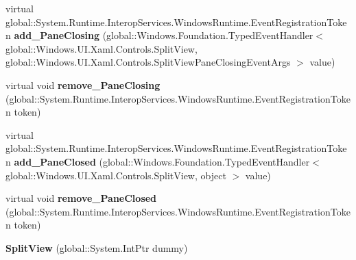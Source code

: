 \begin{DoxyCompactItemize}
virtual global\+::\+System.\+Runtime.\+Interop\+Services.\+Windows\+Runtime.\+Event\+Registration\+Token {\bfseries add\+\_\+\+Pane\+Closing} (global\+::\+Windows.\+Foundation.\+Typed\+Event\+Handler$<$ global\+::\+Windows.\+U\+I.\+Xaml.\+Controls.\+Split\+View, global\+::\+Windows.\+U\+I.\+Xaml.\+Controls.\+Split\+View\+Pane\+Closing\+Event\+Args $>$ value)
\item 
\mbox{\label{class_windows_1_1_u_i_1_1_xaml_1_1_controls_1_1_split_view_a7e6d1bbf867167e713891bded6a87a82}} 
virtual void {\bfseries remove\+\_\+\+Pane\+Closing} (global\+::\+System.\+Runtime.\+Interop\+Services.\+Windows\+Runtime.\+Event\+Registration\+Token token)
\item 
\mbox{\label{class_windows_1_1_u_i_1_1_xaml_1_1_controls_1_1_split_view_a97df60d3e67c146b713f4eb1565c5602}} 
virtual global\+::\+System.\+Runtime.\+Interop\+Services.\+Windows\+Runtime.\+Event\+Registration\+Token {\bfseries add\+\_\+\+Pane\+Closed} (global\+::\+Windows.\+Foundation.\+Typed\+Event\+Handler$<$ global\+::\+Windows.\+U\+I.\+Xaml.\+Controls.\+Split\+View, object $>$ value)
\item 
\mbox{\label{class_windows_1_1_u_i_1_1_xaml_1_1_controls_1_1_split_view_a512973422bb0ef5a03c4a96d88f7f082}} 
virtual void {\bfseries remove\+\_\+\+Pane\+Closed} (global\+::\+System.\+Runtime.\+Interop\+Services.\+Windows\+Runtime.\+Event\+Registration\+Token token)
\item 
\mbox{\label{class_windows_1_1_u_i_1_1_xaml_1_1_controls_1_1_split_view_a83623aee98314bfa486d2e3c5b583543}} 
{\bfseries Split\+View} (global\+::\+System.\+Int\+Ptr dummy)
\end{DoxyCompactItemize}
